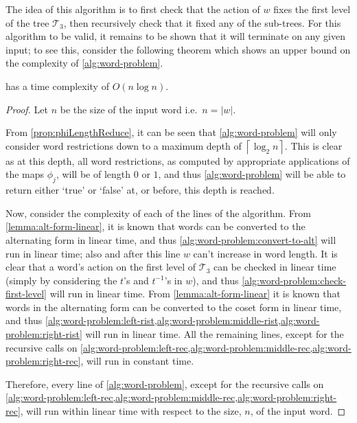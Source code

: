 The idea of this algorithm is to first check that the action of $w$ fixes the first level of the tree $\mathcal{T}_3$, then recursively check that it fixed any of the sub-trees.
For this algorithm to be valid, it remains to be shown that it will terminate on any given input; to see this, consider the following theorem which shows an upper bound on the complexity of \cref{alg:word-problem}.

\begin{theorem}
	\label{thm:word-problem-complexity}
	 has a time complexity of $O(n\log n)$.
\end{theorem}

\begin{proof}

Let $n$ be the size of the input word i.e.\ $n = \left\vert w \right\vert$.

From \cref{prop:phiLengthReduce}, it can be seen that \cref{alg:word-problem} will only consider word restrictions down to a maximum depth of $\left\lceil \log_2 n \right\rceil$.
This is clear as at this depth, all word restrictions, as computed by appropriate applications of the maps $\phi_j$, will be of length $0$ or $1$, and thus \cref{alg:word-problem} will be able to return either `true' or `false' at, or before, this depth is reached.

Now, consider the complexity of each of the lines of the algorithm.
From \cref{lemma:alt-form-linear}, it is known that words can be converted to the alternating form in linear time, and thus \cref{alg:word-problem:convert-to-alt} will run in linear time; also and after this line $w$ can't increase in word length.
It is clear that a word's action on the first level of $\mathcal{T}_3$ can be checked in linear time (simply by considering the $t$'s and $t^{-1}$'s in $w$), and thus \cref{alg:word-problem:check-first-level} will run in linear time.
From \cref{lemma:alt-form-linear} it is known that words in the alternating form can be converted to the coset form in linear time, and thus \cref{alg:word-problem:left-rist,alg:word-problem:middle-rist,alg:word-problem:right-rist} will run in linear time.
All the remaining lines, except for the recursive calls on \cref{alg:word-problem:left-rec,alg:word-problem:middle-rec,alg:word-problem:right-rec}, will run in constant time.

Therefore, every line of \cref{alg:word-problem}, except for the recursive calls on \cref{alg:word-problem:left-rec,alg:word-problem:middle-rec,alg:word-problem:right-rec}, will run within linear time with respect to the size, $n$, of the input word.


\end{proof}
